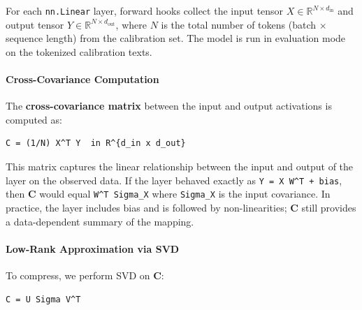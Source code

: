 For each \texttt{nn.Linear} layer, forward hooks collect the input tensor $X \in \mathbb{R}^{N \times d_{\text{in}}}$ and output tensor $Y \in \mathbb{R}^{N \times d_{\text{out}}}$, where $N$ is the total number of tokens (batch $\times$ sequence length) from the calibration set. The model is run in evaluation mode on the tokenized calibration texts.

\paragraph{Cross-Covariance Computation}

The \textbf{cross-covariance matrix} between the input and output activations is computed as:

\vspace{0.5em}
\begin{mdframed}[backgroundcolor=codebg, linecolor=codeframe, linewidth=1pt, roundcorner=4pt, innerleftmargin=2pt, innerrightmargin=5pt, innertopmargin=5pt, innerbottommargin=5pt]
\begin{lstlisting}
C = (1/N) X^T Y  in R^{d_in x d_out}
\end{lstlisting}
\end{mdframed}
\vspace{0.5em}

This matrix captures the linear relationship between the input and output of the layer on the observed data. If the layer behaved exactly as \texttt{Y = X W\textasciicircum{}T + bias}, then \textbf{C} would equal \texttt{W\textasciicircum{}T Sigma\_X} where \texttt{Sigma\_X} is the input covariance. In practice, the layer includes bias and is followed by non-linearities; \textbf{C} still provides a data-dependent summary of the mapping.

\paragraph{Low-Rank Approximation via SVD}

To compress, we perform SVD on \textbf{C}:

\vspace{0.5em}
\begin{mdframed}[backgroundcolor=codebg, linecolor=codeframe, linewidth=1pt, roundcorner=4pt, innerleftmargin=2pt, innerrightmargin=5pt, innertopmargin=5pt, innerbottommargin=5pt]
\begin{lstlisting}
C = U Sigma V^T
\end{lstlisting}
\end{mdframed}
\vspace{0.5em}

